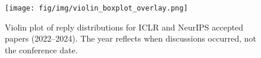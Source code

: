 
\begin{figure}[th!]
    \centering
    \texttt{[image: fig/img/violin\_boxplot\_overlay.png]}
    \caption{Violin plot of reply distributions for ICLR and NeurIPS accepted papers (2022–2024). The year reflects when discussions occurred, not the conference date. }
    \vspace{-10pt}
    \label{fig:replies_boxplot}
\end{figure}

